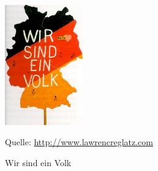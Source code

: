 \documentclass[12pt,a4paper]{article}
\begin{document}
\begin{figure}[h]
    \centering
    \includegraphics[width=0.3\textwidth]{Bilder/einvolk.jpg}
    \caption{Wir sind ein Volk}
    Quelle: \url{http://www.lawrencreglatz.com}
    \label{img:einvolk}
\end{figure}





\newpage



\listoffigures



\newpage



\printbibliography
\end{document}
